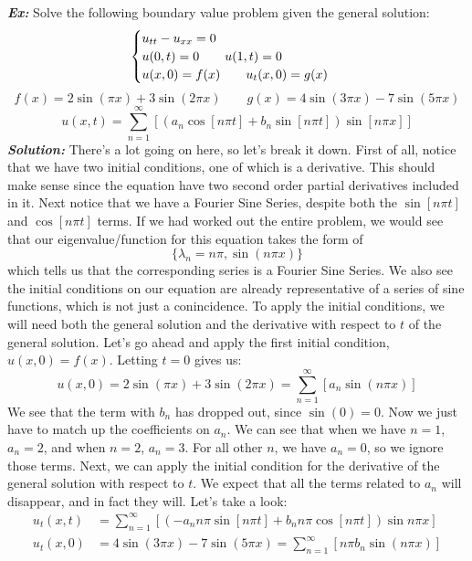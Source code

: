 \documentclass{article}
\begin{document}
\newpage
\noindent\textbf{\textit{Ex:}} Solve the following boundary value problem given the general solution:
\[
\begin{cases}
u_{tt} - u_{xx} = 0\\
u(0,t) = 0\qquad u(1,t) = 0\\
u(x,0) = f(x)\qquad u_{t}(x,0) = g(x)
\end{cases}\\
\]
\[f(x) = 2\sin{(\pi x)} + 3\sin{(2\pi x)}\qquad g(x) = 4\sin{(3\pi x)} - 7\sin{(5\pi x)}\]
\[u(x,t) = \sum_{n=1}^{\infty}\left[\left(a_{n}\cos{[n\pi t]} + b_{n}\sin{[n\pi t]}\right)\sin{[n\pi x]}\right]\]
\indent\textbf{\textit{Solution:}} There's a lot going on here, so let's break it down. First of all, notice that we have two initial conditions, one of which is a derivative. This should make sense since the equation have two second order partial derivatives included in it. Next notice that we have a Fourier Sine Series, despite both the $\sin{[n\pi t]}$ and $\cos{[n\pi t]}$ terms. If we had worked out the entire problem, we would see that our eigenvalue/function for this equation takes the form of 
\[
\{\lambda_{n} = n\pi, \sin{(n\pi x)}\}
\]
\noindent which tells us that the corresponding series is a Fourier Sine Series. We also see the initial conditions on our equation are already representative of a series of sine functions, which is not just a conincidence. To apply the initial conditions, we will need both the general solution and the derivative with respect to $t$ of the general solution. Let's go ahead and apply the first initial condition, $u(x,0) = f(x)$. Letting $t= 0$ gives us:
\[
u(x,0) = 2\sin{(\pi x)} + 3\sin{(2\pi x)} = \sum_{n=1}^{\infty}\left[a_{n}\sin{(n\pi x)}\right]
\]
\noindent We see that the term with $b_{n}$ has dropped out, since $\sin{(0)} = 0$. Now we just have to match up the coefficients on $a_{n}$. We can see that when we have $n=1$, $a_{n} = 2$, and when $n=2$, $a_{n} = 3$. For all other $n$, we have $a_{n} = 0$, so we ignore those terms. Next, we can apply the initial condition for the derivative of the general solution with respect to $t$. We expect that all the terms related to $a_{n}$ will disappear, and in fact they will. Let's take a look:
\begin{align*}
u_{t}(x,t) &= \sum_{n=1}^{\infty}\left[(-a_{n}n\pi\sin{[n\pi t]} + b_{n}n\pi\cos{[n\pi t]})\sin{n\pi x}\right]\\
u_{t}(x,0) &= 4\sin{(3\pi x)} - 7\sin{(5\pi x)} = \sum_{n=1}^{\infty}\left[n\pi b_{n}\sin{(n\pi x)}\right]
\end{align*}
\end{document}
